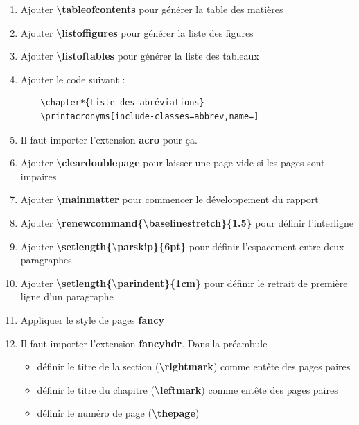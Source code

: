 \documentclass[11pt, a4paper]{article}
\begin{document}
\begin{enumerate}
	\item Ajouter \textbf{\textbackslash tableofcontents} pour générer la table des matières
	
	\item Ajouter \textbf{\textbackslash listoffigures} pour générer la liste des figures
	
	\item Ajouter \textbf{\textbackslash listoftables} pour générer la liste des tableaux
	
	\item Ajouter le code suivant : 
	\begin{verbatim}
	\chapter*{Liste des abréviations}
	\printacronyms[include-classes=abbrev,name=]
	\end{verbatim}
	
	\item Il faut importer l'extension \textbf{acro} pour ça.
	
	\item Ajouter \textbf{\textbackslash cleardoublepage} pour laisser une page vide si les pages sont impaires

	\item Ajouter \textbf{\textbackslash mainmatter} pour commencer le développement du rapport
	
	\item Ajouter \textbf{\textbackslash renewcommand\{\textbackslash baselinestretch\}\{1.5\} } pour définir l'interligne 
	
	\item Ajouter \textbf{\textbackslash setlength\{\textbackslash parskip\}\{6pt\} } pour définir l'espacement entre deux paragraphes 
	
	\item Ajouter \textbf{\textbackslash setlength\{\textbackslash parindent\}\{1cm\} } pour définir le retrait de première ligne d'un paragraphe
	
	\item Appliquer le style de pages \textbf{fancy}
	
	\item Il faut importer l'extension \textbf{fancyhdr}. Dans la préambule
	\begin{itemize}
		\item définir le titre de la section (\textbf{\textbackslash rightmark}) comme entête des pages paires 
		\item définir le titre du chapitre (\textbf{\textbackslash leftmark}) comme entête des pages paires 
		\item définir le numéro de page (\textbf{\textbackslash thepage})
	\end{itemize}


\end{enumerate}
\end{document}
